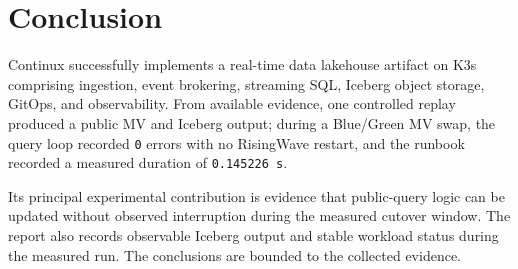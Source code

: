 \section{Conclusion}\label{sec:conclusion}
Continux successfully implements a real-time data lakehouse artifact on K3s comprising ingestion, event brokering, streaming SQL, Iceberg object storage, GitOps, and observability. From available evidence, one controlled replay produced a public MV and Iceberg output; during a Blue/Green MV swap, the query loop recorded \texttt{0} errors with no RisingWave restart, and the runbook recorded a measured duration of \texttt{0.145226 s}.

Its principal experimental contribution is evidence that public-query logic can be updated without observed interruption during the measured cutover window. The report also records observable Iceberg output and stable workload status during the measured run. The conclusions are bounded to the collected evidence.

\setlength\bibitemsep{1pt}
\setlength\bibhang{1em}
\renewcommand*{\bibfont}{\small}
